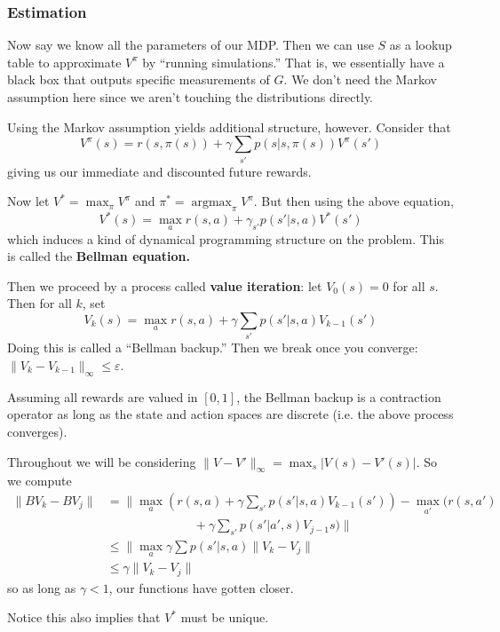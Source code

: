 \documentclass[12pt]{article}
\DeclareMathOperator*{\argmax}{argmax}
\begin{document}
\subsubsection{Estimation}
Now say we know all the parameters of our MDP. Then we can use $S$ as a lookup table to approximate $V^\pi$ by ``running simulations.'' That is, we essentially 
have a black box that outputs specific measurements of $G$. We don't need the Markov assumption here since we aren't touching the distributions directly.

Using the Markov assumption yields additional structure, however. Consider that 
\[V^\pi(s)= r(s,\pi(s))+\gamma\sum_{s'}p(s|s,\pi(s))V^\pi(s')\]
giving us our immediate and discounted future rewards.

Now let $V^\ast=\max_{\pi}V^\pi$ and $\pi^\ast=\argmax_\pi V^\pi$. But then using the above equation,
\[V^\ast(s)=\max_a r(s,a)+\gamma_{s'}p(s'|s,a)V^\ast(s')\]
which induces a kind of dynamical programming structure on the problem. This is called the \textbf{Bellman equation.}

Then we proceed by a process called \textbf{value iteration}: let $V_0(s)=0$ for all $s$. Then for all $k$, set 
\[V_k(s)=\max_a r(s,a)+\gamma\sum_{s'}p(s'|s,a)V_{k-1}(s')\]
Doing this is called a ``Bellman backup.'' Then we break once you converge: $\|V_k-V_{k-1}\|_\infty\le\varepsilon$.

\begin{lem}
	Assuming all rewards are valued in $[0,1]$, the Bellman backup is a contraction operator as long as the state and action spaces are discrete (i.e. the above process converges).
\end{lem}
\begin{prf}
	Throughout we will be considering $\|V-V'\|_\infty=\max_s|V(s)-V'(s)|$. So we compute 
	\begin{align*}
		\|BV_k-BV_j\|&=\|\max_a(r(s,a)+\gamma\sum_{s'}p(s'|s,a)V_{k-1}(s'))-\max_{a'}(r(s,a')\\
		&\qquad\qquad\qquad\quad +\gamma\sum_{s'}p(s'|a',s)V_{j-1}s)\|\\
		&\le\|\max_a \gamma\sum p(s'|s,a)\|V_k-V_j\|\\
		&\le \gamma\|V_k-V_j\|
	\end{align*}
	so as long as $\gamma<1$, our functions have gotten closer.
\end{prf}
\begin{rmk}
	Notice this also implies that $V^\ast$ must be unique.
\end{rmk}
\end{document}
